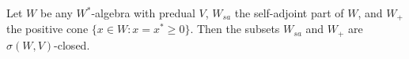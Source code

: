 Let $W$ be any $W^*$-algebra with predual $V$, $W_{sa}$ the self-adjoint part of $W$, and $W_+$ the positive cone $\{x \in W : x = x^* \geq 0\}$. Then the subsets $W_{sa}$ and $W_+$ are $\sigma(W, V)$-closed.

